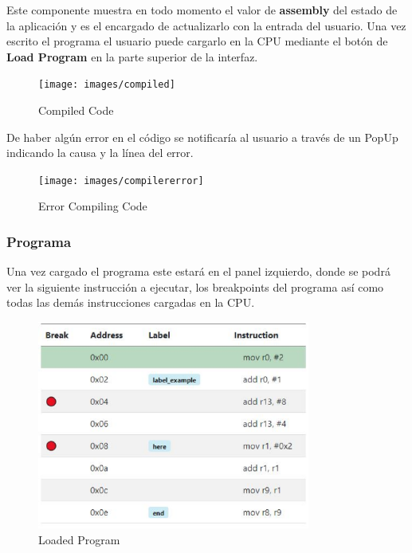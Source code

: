 {{            Este componente muestra en todo momento el valor de \textbf{assembly} del estado de la aplicación y es el encargado de actualizarlo con la entrada del usuario.
            Una vez escrito el programa el usuario puede cargarlo en la CPU mediante el botón de \textbf{Load Program} en la parte superior de la interfaz. \\

            \begin{figure}[h]
                \centering
                \texttt{[image: images/compiled]}
                \caption{Compiled Code}
            \end{figure}

            \newpage
            De haber algún error en el código se notificaría al usuario a través de un PopUp indicando la causa y la línea del error.

            \begin{figure}[h]
                \centering
                \texttt{[image: images/compilererror]}
                \caption{Error Compiling Code}
            \end{figure}
        }
        
        \subsubsection{Programa}
        {
            Una vez cargado el programa este estará en el panel izquierdo, donde se podrá ver la siguiente instrucción a ejecutar,
            los breakpoints del programa así como todas las demás instrucciones cargadas en la CPU. \\
            
            \begin{figure}[h]
                \centering
                \includegraphics[width=0.8\textwidth, height=0.35\textheight]{images/programa}
                \caption{Loaded Program}
            \end{figure}
            
}}
